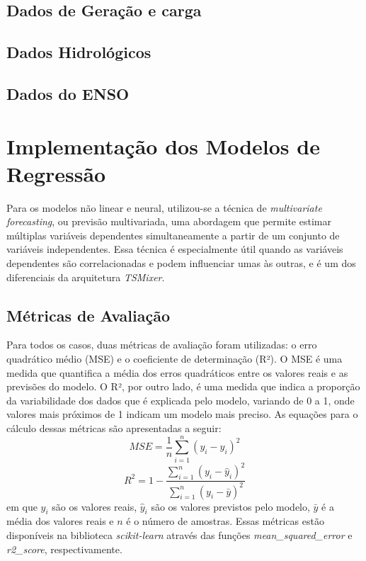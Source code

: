 \subsection{Dados de Geração e carga} %

\subsection{Dados Hidrológicos} %

\subsection{Dados do ENSO} %


\section{Implementação dos Modelos de Regressão} %
Para os modelos não linear e neural, utilizou-se a técnica de \textit{multivariate forecasting}, ou previsão multivariada, 
uma abordagem que permite estimar múltiplas variáveis dependentes simultaneamente a partir de um conjunto de variáveis independentes. 
Essa técnica é especialmente útil quando as variáveis dependentes são correlacionadas e podem influenciar umas às outras, e 
é um dos diferenciais da arquitetura \textit{TSMixer}.

\subsection{Métricas de Avaliação} %
Para todos os casos, duas métricas de avaliação foram utilizadas: o erro quadrático médio (MSE) e o coeficiente de determinação (R²).
O MSE é uma medida que quantifica a média dos erros quadráticos entre os valores reais e as previsões do modelo. O R², por outro lado, 
é uma medida que indica a proporção da variabilidade dos dados que é explicada pelo modelo, variando de 0 a 1, onde valores mais 
próximos de 1 indicam um modelo mais preciso. As equações para o cálculo dessas métricas são apresentadas a seguir:
\begin{equation}
    \label{eq:mse}
    MSE = \frac{1}{n} \sum_{i=1}^{n} (y_i - \hat{y}_i)^2
\end{equation}
\begin{equation}
    \label{eq:r2}
    R^2 = 1 - \frac{\sum_{i=1}^{n} (y_i - \hat{y}_i)^2}{\sum_{i=1}^{n} (y_i - \bar{y})^2}
\end{equation}
em que $ y_i $ são os valores reais, $ \hat{y}_i $ são os valores previstos pelo modelo, $ \bar{y} $ é a média dos valores 
reais e $ n $ é o número de amostras. Essas métricas estão disponíveis na biblioteca \textit{scikit-learn} através das
funções \textit{mean\_squared\_error} e \textit{r2\_score}, respectivamente.

